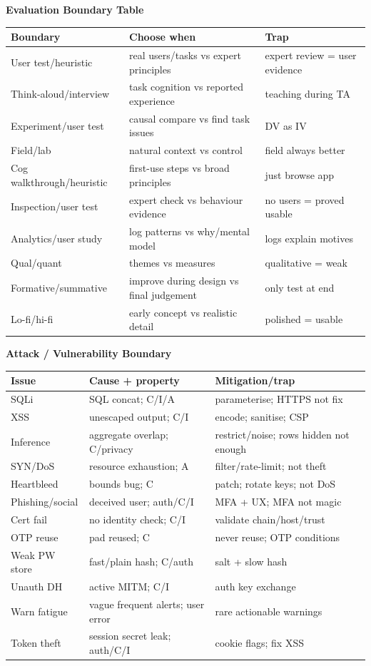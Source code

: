 \documentclass[8pt]{extarticle}
\newcommand{\h}[1]{\vspace{1pt}\textbf{#1}\par}
\begin{document}
\begin{multicols*}{5}
\h{Evaluation Boundary Table}
\begin{tabularx}{\linewidth}{@{}lYY@{}}
\toprule
Boundary & Choose when & Trap\\ \midrule
User test/heuristic & real users/tasks vs expert principles & expert review = user evidence\\
Think-aloud/interview & task cognition vs reported experience & teaching during TA\\
Experiment/user test & causal compare vs find task issues & DV as IV\\
Field/lab & natural context vs control & field always better\\
Cog walkthrough/heuristic & first-use steps vs broad principles & just browse app\\
Inspection/user test & expert check vs behaviour evidence & no users = proved usable\\
Analytics/user study & log patterns vs why/mental model & logs explain motives\\
Qual/quant & themes vs measures & qualitative = weak\\
Formative/summative & improve during design vs final judgement & only test at end\\
Lo-fi/hi-fi & early concept vs realistic detail & polished = usable\\
\bottomrule
\end{tabularx}

\h{Attack / Vulnerability Boundary}
\begin{tabularx}{\linewidth}{@{}lYY@{}}
\toprule
Issue & Cause + property & Mitigation/trap\\ \midrule
SQLi & SQL concat; C/I/A & parameterise; HTTPS not fix\\
XSS & unescaped output; C/I & encode; sanitise; CSP\\
Inference & aggregate overlap; C/privacy & restrict/noise; rows hidden not enough\\
SYN/DoS & resource exhaustion; A & filter/rate-limit; not theft\\
Heartbleed & bounds bug; C & patch; rotate keys; not DoS\\
Phishing/social & deceived user; auth/C/I & MFA + UX; MFA not magic\\
Cert fail & no identity check; C/I & validate chain/host/trust\\
OTP reuse & pad reused; C & never reuse; OTP conditions\\
Weak PW store & fast/plain hash; C/auth & salt + slow hash\\
Unauth DH & active MITM; C/I & auth key exchange\\
Warn fatigue & vague frequent alerts; user error & rare actionable warnings\\
Token theft & session secret leak; auth/C/I & cookie flags; fix XSS\\
\bottomrule
\end{tabularx}


\end{multicols*}
\end{document}
